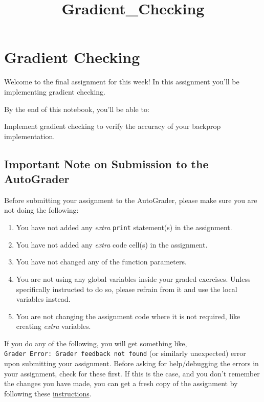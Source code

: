 \documentclass[11pt]{article}
\title{Gradient\_Checking}
\providecommand{\tightlist}{%
      \setlength{\itemsep}{0pt}\setlength{\parskip}{0pt}}
\begin{document}
    
    \maketitle
    
    

    
    \hypertarget{gradient-checking}{%
\section{Gradient Checking}\label{gradient-checking}}

Welcome to the final assignment for this week! In this assignment you'll
be implementing gradient checking.

By the end of this notebook, you'll be able to:

Implement gradient checking to verify the accuracy of your backprop
implementation.

\hypertarget{important-note-on-submission-to-the-autograder}{%
\subsection{Important Note on Submission to the
AutoGrader}\label{important-note-on-submission-to-the-autograder}}

Before submitting your assignment to the AutoGrader, please make sure
you are not doing the following:

\begin{enumerate}
\def\labelenumi{\arabic{enumi}.}
\tightlist
\item
  You have not added any \emph{extra} \texttt{print} statement(s) in the
  assignment.
\item
  You have not added any \emph{extra} code cell(s) in the assignment.
\item
  You have not changed any of the function parameters.
\item
  You are not using any global variables inside your graded exercises.
  Unless specifically instructed to do so, please refrain from it and
  use the local variables instead.
\item
  You are not changing the assignment code where it is not required,
  like creating \emph{extra} variables.
\end{enumerate}

If you do any of the following, you will get something like,
\texttt{Grader\ Error:\ Grader\ feedback\ not\ found} (or similarly
unexpected) error upon submitting your assignment. Before asking for
help/debugging the errors in your assignment, check for these first. If
this is the case, and you don't remember the changes you have made, you
can get a fresh copy of the assignment by following these
\href{https://www.coursera.org/learn/deep-neural-network/supplement/QWEnZ/h-ow-to-refresh-your-workspace}{instructions}.
\end{document}
